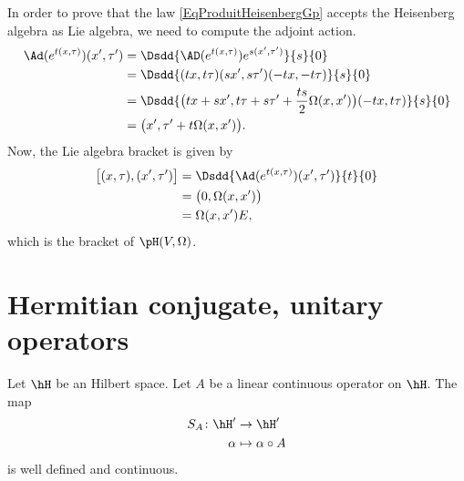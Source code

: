 In order to prove that the law \eqref{EqProduitHeisenbergGp} accepts the Heisenberg algebra as Lie algebra, we need to compute the adjoint action.
\begin{equation}
	\begin{aligned}[]
		\Ad( e^{t(x,\tau)})(x',\tau') & =\Dsdd{ \AD( e^{t(x,\tau)}) e^{s(x',\tau')} }{s}{0}                                 \\
		                              & =\Dsdd{ (tx,t\tau)(sx',s\tau')(-tx,-t\tau) }{s}{0}                                  \\
		                              & =\Dsdd{ \big(tx+sx',t\tau+s\tau'+\frac{ ts }{2}\Omega(x,x')\big)(-tx,t\tau) }{s}{0} \\
		                              & =\big( x',\tau'+t\Omega(x,x') \big).
	\end{aligned}
\end{equation}
Now, the Lie algebra bracket is given by
\begin{equation}
	\begin{aligned}[]
		\big[ (x,\tau),(x',\tau') \big] & =\Dsdd{ \Ad( e^{t(x,\tau)})(x',\tau') }{t}{0} \\
		                                & =\big( 0,\Omega(x,x') \big)                   \\
		                                & =\Omega(x,x')E,
	\end{aligned}
\end{equation}
which is the bracket of $\pH(V,\Omega)$.

\section{Hermitian conjugate, unitary operators}

\begin{lemma}
	Let \( \hH\) be an Hilbert space. Let \( A\) be a linear continuous operator on \( \hH\). The map
	\begin{equation}
		\begin{aligned}
			S_A\colon \hH' & \to \hH'              \\
			\alpha         & \mapsto \alpha\circ A
		\end{aligned}
	\end{equation}
	is well defined and continuous.
\end{lemma}

